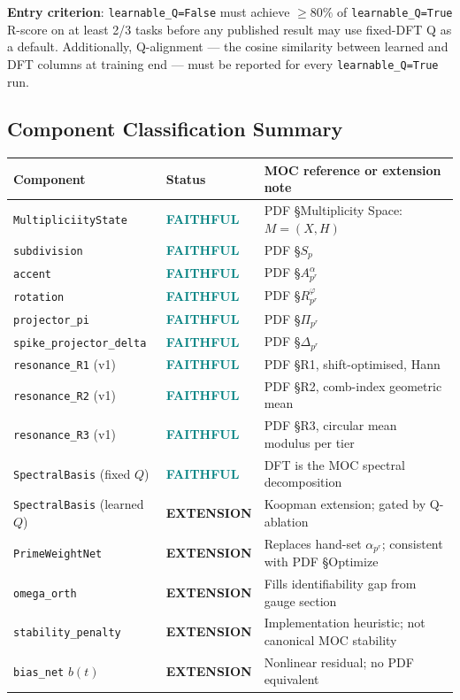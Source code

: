 \documentclass[11pt,a4paper]{article}
\theoremstyle{plain}
\theoremstyle{definition}
\theoremstyle{remark}
\newcommand{\faithful}{\textcolor{teal}{\textbf{FAITHFUL}}}
\newcommand{\extension}{\textcolor{rust}{\textbf{EXTENSION}}}
\begin{document}
\textbf{Entry criterion}: \texttt{learnable\_Q=False} must achieve $\ge 80\%$ of
\texttt{learnable\_Q=True} R-score on at least 2/3 tasks before any published result
may use fixed-DFT Q as a default. Additionally, Q-alignment --- the cosine similarity
between learned and DFT columns at training end --- must be reported for every
\texttt{learnable\_Q=True} run.

\subsection{Component Classification Summary}

\begin{center}
\begin{tabular}{llp{5.2cm}}
  \toprule
  Component & Status & MOC reference or extension note \\
  \midrule
  \texttt{MultipliciityState} & \faithful{} & PDF §Multiplicity Space: $M = (X,H)$ \\
  \texttt{subdivision} & \faithful{} & PDF §$S_p$ \\
  \texttt{accent} & \faithful{} & PDF §$A_{p^r}^\alpha$ \\
  \texttt{rotation} & \faithful{} & PDF §$R_{p^r}^\varphi$ \\
  \texttt{projector\_pi} & \faithful{} & PDF §$\Pi_{p^r}$ \\
  \texttt{spike\_projector\_delta} & \faithful{} & PDF §$\Delta_{p^r}$ \\
  \texttt{resonance\_R1} (v1) & \faithful{} & PDF §R1, shift-optimised, Hann \\
  \texttt{resonance\_R2} (v1) & \faithful{} & PDF §R2, comb-index geometric mean \\
  \texttt{resonance\_R3} (v1) & \faithful{} & PDF §R3, circular mean modulus per tier \\
  \texttt{SpectralBasis} (fixed $Q$) & \faithful{} & DFT is the MOC spectral decomposition \\
  \texttt{SpectralBasis} (learned $Q$) & \extension{} & Koopman extension; gated by Q-ablation \\
  \texttt{PrimeWeightNet} & \extension{} & Replaces hand-set $\alpha_{p^r}$; consistent with PDF §Optimize \\
  \texttt{omega\_orth} & \extension{} & Fills identifiability gap from gauge section \\
  \texttt{stability\_penalty} & \extension{} & Implementation heuristic; not canonical MOC stability \\
  \texttt{bias\_net} $b(t)$ & \extension{} & Nonlinear residual; no PDF equivalent \\
  \bottomrule
\end{tabular}
\end{center}
\end{document}
